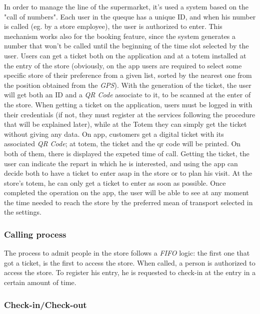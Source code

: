 \documentclass{article}
\begin{document}
		In order to manage the line of the supermarket, it's used a system based on the "call of numbers". Each user in the queque has a unique ID, and when his number is called (eg. by a store employee), the user is authorized to enter. This mechanism works also for the booking feature, since the system generates a number that won't be called until the beginning of the time slot selected by the user. Users can get a ticket both on the application and at a totem installed at the entry of the store (obviously, on the app users are required to select some specific store of their preference from a given list, sorted by the nearest one from the position obtained from the \emph{GPS}). With the generation of the ticket, the user will get both an ID and a \emph{QR Code} associate to it, to be scanned at the enter of the store. When getting a ticket on the application, users must be logged in with their credentials (if not, they must register at the services following the procedure that will be explained later), while at the Totem they can simply get the ticket without giving any data. On app, customers get a digital ticket with its associated \emph{QR Code}; at totem, the ticket and the qr code will be printed. On both of them, there is displayed the expeted time of call. Getting the ticket, the user can indicate the repart in which he is interested, and using the app can decide both to have a ticket to enter asap in the store or to plan his visit. At the store's totem, he can only get a ticket to enter as soon as possible. Once completed the operation on the app, the user will be able to see at any moment the time needed to reach the store by the preferred mean of transport selected in the settings.
		
		\subsubsection{Calling process}
		
		The process to admit people in the store follows a \emph{FIFO} logic: the first one that got a ticket, is the first to access the store. When called, a person is authorized to access the store. To register his entry, he is requested to check-in at the entry in a certain amount of time. \\
		
		\subsubsection{Check-in/Check-out}
		
\end{document}
